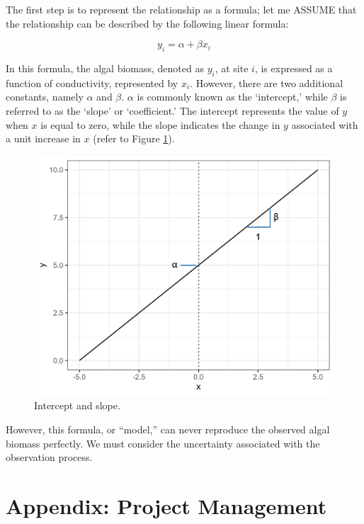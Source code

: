 \documentclass[
]{book}
\begin{document}
The first step is to represent the relationship as a formula; let me ASSUME that the relationship can be described by the following linear formula:

\[
y_i = \alpha + \beta x_i
\]

In this formula, the algal biomass, denoted as \(y_i\), at site \(i\), is expressed as a function of conductivity, represented by \(x_i\). However, there are two additional constants, namely \(\alpha\) and \(\beta\). \(\alpha\) is commonly known as the `intercept,' while \(\beta\) is referred to as the `slope' or `coefficient.' The intercept represents the value of \(y\) when \(x\) is equal to zero, while the slope indicates the change in \(y\) associated with a unit increase in \(x\) (refer to Figure \ref{fig:intercept-slope}).

\begin{figure}

{\centering \includegraphics[width=20.83in]{image/figure_lm} 

}

\caption{Intercept and slope.}\label{fig:intercept-slope}
\end{figure}

However, this formula, or ``model,'' can never reproduce the observed algal biomass perfectly. We must consider the uncertainty associated with the observation process.

\hypertarget{appendix-project-management}{%
\chapter{Appendix: Project Management}\label{appendix-project-management}}
\end{document}
